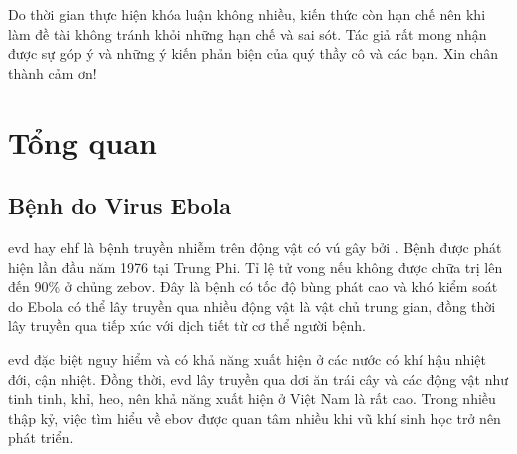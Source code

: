 \documentclass[12pt,a4paper,reqno, oneside]{book}
\begin{document}
	Do thời gian thực hiện khóa luận không nhiều, kiến thức còn hạn chế nên khi làm đề tài không tránh khỏi những hạn chế và sai sót. Tác giả rất mong nhận được sự góp ý và những ý kiến phản biện của quý thầy cô và các bạn.
	\textrm{Xin chân thành cảm ơn!}
 


\newpage
\pagestyle{fancy}
\setcounter{chapter}{0}
\chapter{Tổng quan}
\hspace{18pt}
\section{Bệnh do Virus Ebola}
\hspace{18pt}
	\gls{evd} hay \gls{ehf} là bệnh truyền nhiễm trên động vật có vú gây bởi . Bệnh được phát hiện lần đầu năm 1976 tại Trung Phi\cite{}. Tỉ lệ tử vong nếu không được chữa trị lên đến 90\% ở chủng \gls{zebov}\cite{}. Đây là bệnh có tốc độ bùng phát cao và khó kiểm soát do Ebola có thể lây truyền qua nhiều động vật là vật chủ trung gian, đồng thời lây truyền qua tiếp xúc với dịch tiết từ cơ thể người bệnh\cite{}.
	
	\gls{evd} đặc biệt nguy hiểm và có khả năng xuất hiện ở các nước có khí hậu nhiệt đới, cận nhiệt\cite{}. Đồng thời, \gls{evd} lây truyền qua dơi ăn trái cây và các động vật như tinh tinh, khỉ, heo\cite{Kuhn2010}, nên khả năng xuất hiện ở Việt Nam là rất cao. Trong nhiều thập kỷ, việc tìm hiểu về \gls{ebov} được quan tâm nhiều khi vũ khí sinh học trở nên phát triển\cite{}.
	
\end{document}
